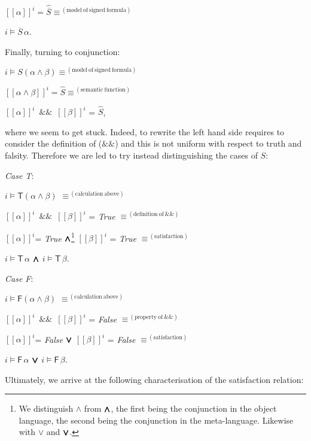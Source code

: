 \documentclass[a4paper,UKenglish]{lipics}
\newcounter{c}
\newcommand{\note}[1]{\textsl{#1}}
\newcommand{\cnst}[1]{\textsl{#1}}
\newcommand{\sg}[1]{\textsf{#1}}
\newcommand{\band}{\ensuremath{\&\&}}
\newcommand{\mean}[1]{\ensuremath{\hat{#1}}}
\newcommand{\op}[1]{\ensuremath{\overline{#1}}}
\newcommand{\vval}[2]{\ensuremath{[\![ #1]\!]^{#2}}}
\newcommand{\sat}[2]{\ensuremath{#1\models#2}}
\newcommand{\Mwedge}{\ensuremath{{\wedge\hspace{-0.65em}\wedge}\hspace{-0.65em}{\wedge\hspace{-0.65em}\wedge}}}
\newcommand{\Mvee}{\ensuremath{{\vee\hspace{-0.65em}\vee}\hspace{-0.65em}{\vee\hspace{-0.65em}\vee}}}
\begin{document}
$\vval{\alpha}{i} = \mean{\op{S}}
\equiv^{\mathrm{\ (model\ of\ signed\ formula)}}$

\sat{i}{\op{S}\,\alpha}.

\noindent Finally, turning to conjunction:

$\sat{i}{S(\alpha\wedge\beta)} 
\equiv^{\mathrm{\ (model\ of\ signed\ formula)}}$

$\vval{\alpha\wedge\beta}{i} = \mean{S}
\equiv^{\mathrm{\ (semantic\ function)}}$

\vval{\alpha}{i}\ \band\ \vval{\beta}{i}  = \mean{S},

\noindent where we seem to get stuck. Indeed, to rewrite the left hand side requires to consider the definition of (\band) and this is not uniform with respect to truth and falsity.  
Therefore we are led to try instead distinguishing the cases of $S$:

\note{Case \sg{T}}:


\sat{i}{\sg{T}(\alpha\wedge\beta)} 
$\equiv^{\mathrm{\ (calculation\ above)}}$

\vval{\alpha}{i}\ \band\ \vval{\beta}{i}  = \cnst{True}
$\equiv^{\mathrm{\ (definition\ of\ \band)}}$

\vval{\alpha}{i}= \cnst{True} $\Mwedge$\footnote{We distinguish $\wedge$ from $\Mwedge$, the first being the conjunction in the object language, the second being the conjunction in the meta-language. Likewise with $\vee$ and $\Mvee$.} \vval{\beta}{i}  = \cnst{True}
$\equiv^{\mathrm{\ (satisfaction)}}$

\sat{i}{\sg{T}\,\alpha} $\Mwedge$ \sat{i}{\sg{T}\,\beta}.



\note{Case \sg{F}}:

\sat{i}{\sg{F}(\alpha\wedge\beta)} 
$\equiv^{\mathrm{\ (calculation\ above)}}$

\vval{\alpha}{i}\ \band\ \vval{\beta}{i}  = \cnst{False}
$\equiv^{\mathrm{\ (property\ of\ \band)}}$

\vval{\alpha}{i}= \cnst{False} $\Mvee$ \vval{\beta}{i}  = \cnst{False}
$\equiv^{\mathrm{\ (satisfaction)}}$

\sat{i}{\sg{F}\,\alpha} $\Mvee$ \sat{i}{\sg{F}\,\beta}.



\noindent Ultimately, we arrive at the following characterisation of the satisfaction relation:
\end{document}

